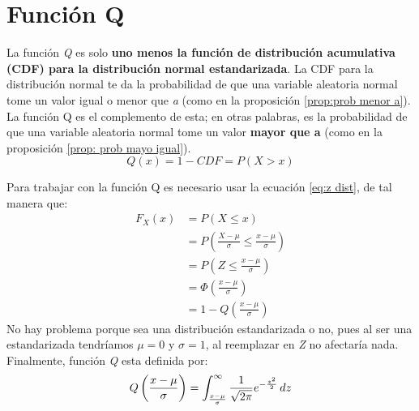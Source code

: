 \documentclass[
	12pt, %
	fleqn, %
	a4paper, %
	oneside, %
]{LegrandOrangeBook}
\begin{document}
\section{Función Q}
\begin{definition}[Función Q]
La función \textit{Q} es solo \textbf{uno menos la función de distribución acumulativa (CDF) para la distribución normal estandarizada}. La CDF para la distribución normal te da la probabilidad de que una variable aleatoria normal tome un valor igual o menor que \textit{a} (como en la proposición \ref{prop:prob menor a}). La función Q es el complemento de esta; en otras palabras, es la probabilidad de que una variable aleatoria normal tome un valor \textbf{mayor que a} (como en la proposición \ref{prop: prob mayo igual}).
\begin{equation}
\label{eq: q func}
Q(x)=1-CDF=P(X>x)
\end{equation}
\begin{center}
\end{center}
Para trabajar con la función Q es necesario usar la ecuación \ref{eq:z dist}, de tal manera que:
\begin{align*}
F_X(x)&=P(X\leq x)\\
&=P\left(\frac{X-\mu}{\sigma}\leq\frac{x-\mu}{\sigma}\right)\\
&=P\left(Z\leq\frac{x-\mu}{\sigma}\right)\\
&=\Phi\left(\frac{x-\mu}{\sigma}\right)\\
&=1-Q\left(\frac{x-\mu}{\sigma}\right)
\end{align*}
No hay problema porque sea una distribución estandarizada o no, pues al ser una estandarizada tendríamos $\mu=0$ y $\sigma=1$, al reemplazar en \textit{Z} no afectaría nada.
Finalmente, función \textit{Q} esta definida por:
\begin{equation}
Q\left(\frac{x-\mu}{\sigma}\right)=\int_{\frac{x-\mu}{\sigma}}^{\infty}\frac{1}{\sqrt{2\pi}}e^{-\frac{z^2}{2}}\mathop{}\!d z
\end{equation}
\end{definition}
\end{document}
